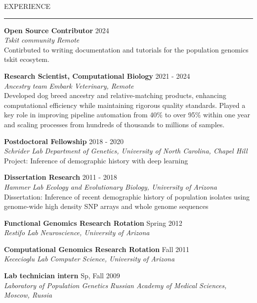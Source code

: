 \documentclass{resume} %
\renewenvironment{rSection}[1]{
\sectionskip
\textcolor{RoyalPurple}{\MakeUppercase{#1}}
\sectionlineskip
\hrule
\begin{list}{}{
\setlength{\leftmargin}{1.5em}
}
\item[]
}{
\end{list}
}
\begin{document}
\begin{rSection}{Experience}

{\bf Open Source Contributor} \hfill  2024\\ 
{\em Tskit community} \hfill {\em Remote}\\
Contirbuted to writing documentation and tutorials for the population genomics tskit ecosytem.

{\bf Research Scientist, Computational Biology} \hfill  2021 - 2024\\ 
{\em Ancestry team} \hfill {\em Embark Veterinary, Remote}\\
Developed dog breed ancestry and relative-matching products, enhancing computational efficiency while maintaining rigorous quality standards. Played a key role in improving pipeline automation from 40\% to over 95\% within one year and scaling processes from hundreds of thousands to millions of samples.

{\bf Postdoctoral Fellowship} \hfill  2018 - 2020\\ 
{\em Schrider Lab} \hfill {\em Department of Genetics, University of North Carolina, Chapel Hill}\\
Project: Inference of demographic history with deep learning

{\bf Dissertation Research} \hfill  2011 - 2018\\ 
{\em Hammer Lab} \hfill {\em Ecology and Evolutionary Biology, University of Arizona}\\
Dissertation: Inference of recent demographic history of population isolates using genome-wide high density SNP arrays and whole genome sequences

{\bf Functional Genomics Research Rotation} \hfill  Spring 2012\\ 
{\em Restifo Lab} \hfill {\em Neuroscience, University of Arizona}

{\bf Computational Genomics Research Rotation} \hfill  Fall 2011\\ 
{\em Kececioglu Lab} \hfill {\em Computer Science, University of Arizona}

{\bf Lab technician intern} \hfill  Sp, Fall 2009\\ 
{\em Laboratory of Population Genetics} \hfill {\em Russian Academy of Medical Sciences, Moscow, Russia}

\end{rSection}


\end{document}
